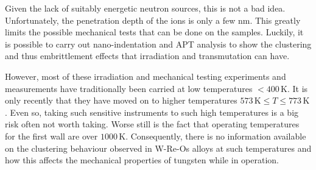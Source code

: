 \documentclass[12pt, a4paper]{article}
\newcommand{\n}{neutron}
\begin{document}
		Given the lack of suitably energetic \n{} sources, this is not a bad idea. Unfortunately, the penetration depth of the ions is only a few nm. This greatly limits the possible mechanical tests that can be done on the samples. Luckily, it is possible to carry out nano-indentation and APT analysis to show the clustering and thus embrittlement effects that irradiation and transmutation can have.
		
		However, most of these irradiation and mechanical testing experiments and measurements have traditionally been carried at low temperatures $< 400\,\textrm{K}$. It is only recently that they have moved on to higher temperatures $573\,\textrm{K} \le T \le 773\,\textrm{K}$. Even so, taking such sensitive instruments to such high temperatures is a big risk often not worth taking. Worse still is the fact that operating temperatures for the first wall are over $1000\,\textrm{K}$. Consequently, there is no information available on the clustering behaviour observed in W-Re-Os alloys at such temperatures and how this affects the mechanical properties of tungsten while in operation.
		
\end{document}
